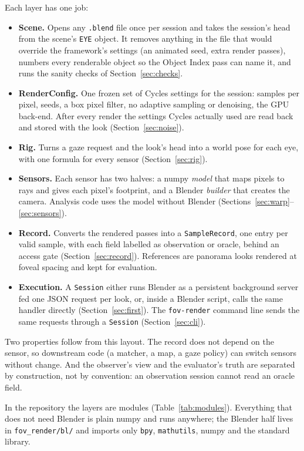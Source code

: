 \documentclass[11pt,a4paper]{article}
\newcommand{\code}[1]{\texttt{\small #1}}
\begin{document}
Each layer has one job:
\begin{itemize}
\item \textbf{Scene.} Opens any \code{.blend} file once per session and takes the session's head from the
  scene's \code{EYE} object. It removes anything in the file that would override the framework's settings (an animated seed, extra
  render passes), numbers every renderable object so the Object Index pass can name it, and runs the sanity
  checks of Section~\ref{sec:checks}.
\item \textbf{RenderConfig.} One frozen set of Cycles settings for the session: samples per pixel, seeds, a box
  pixel filter, no adaptive sampling or denoising, the GPU back-end. After every render the settings Cycles
  actually used are read back and stored with the look (Section~\ref{sec:noise}).
\item \textbf{Rig.} Turns a gaze request and the look's head into a world pose for each eye, with one formula
  for every sensor (Section~\ref{sec:rig}).
\item \textbf{Sensors.} Each sensor has two halves: a numpy \emph{model} that maps pixels to rays and gives each
  pixel's footprint, and a Blender \emph{builder} that creates the camera. Analysis code uses the model without
  Blender (Sections~\ref{sec:warp}--\ref{sec:sensors}).
\item \textbf{Record.} Converts the rendered passes into a \code{SampleRecord}, one entry per valid sample, with
  each field labelled as observation or oracle, behind an access gate (Section~\ref{sec:record}). References are
  panorama looks rendered at foveal spacing and kept for evaluation.
\item \textbf{Execution.} A \code{Session} either runs Blender as a persistent background server fed one JSON
  request per look, or, inside a Blender script, calls the same handler directly (Section~\ref{sec:first}). The
  \code{fov-render} command line sends the same requests through a \code{Session} (Section~\ref{sec:cli}).
\end{itemize}

Two properties follow from this layout. The record does not depend on the sensor, so downstream code (a matcher,
a map, a gaze policy) can switch sensors without change. And the observer's view and the evaluator's truth are
separated by construction, not by convention: an observation session cannot read an oracle field.

In the repository the layers are modules (Table~\ref{tab:modules}). Everything that does not need Blender is
plain numpy and runs anywhere; the Blender half lives in \code{fov\_render/bl/} and imports only \code{bpy},
\code{mathutils}, numpy and the standard library.
\end{document}
